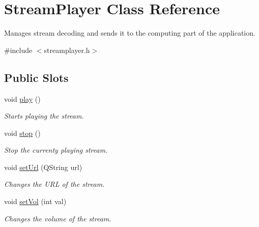 \hypertarget{classStreamPlayer}{
\section{StreamPlayer Class Reference}
\label{classStreamPlayer}
}


Manages stream decoding and sends it to the computing part of the application.  




{\ttfamily \#include $<$streamplayer.h$>$}

\subsection*{Public Slots}
\begin{DoxyCompactItemize}
\item 
\hypertarget{classStreamPlayer_ad0f0287c785318d8b84aa1823155a7eb}{
void \hyperlink{classStreamPlayer_ad0f0287c785318d8b84aa1823155a7eb}{play} ()}
\label{classStreamPlayer_ad0f0287c785318d8b84aa1823155a7eb}

\begin{DoxyCompactList}\small\item\em Starts playing the stream. \item\end{DoxyCompactList}\item 
\hypertarget{classStreamPlayer_a9e15509d91a8ecabe36d3732afdfcb40}{
void \hyperlink{classStreamPlayer_a9e15509d91a8ecabe36d3732afdfcb40}{stop} ()}
\label{classStreamPlayer_a9e15509d91a8ecabe36d3732afdfcb40}

\begin{DoxyCompactList}\small\item\em Stop the currenty playing stream. \item\end{DoxyCompactList}\item 
\hypertarget{classStreamPlayer_adf10c53d47e631a1ddf46cda61b8ccc2}{
void \hyperlink{classStreamPlayer_adf10c53d47e631a1ddf46cda61b8ccc2}{setUrl} (QString url)}
\label{classStreamPlayer_adf10c53d47e631a1ddf46cda61b8ccc2}

\begin{DoxyCompactList}\small\item\em Changes the URL of the stream. \item\end{DoxyCompactList}\item 
\hypertarget{classStreamPlayer_a3019d95c683e2023ec5dfd84017481de}{
void \hyperlink{classStreamPlayer_a3019d95c683e2023ec5dfd84017481de}{setVol} (int val)}
\label{classStreamPlayer_a3019d95c683e2023ec5dfd84017481de}

\begin{DoxyCompactList}\small\item\em Changes the volume of the stream. \item\end{DoxyCompactList}\end{DoxyCompactItemize}
